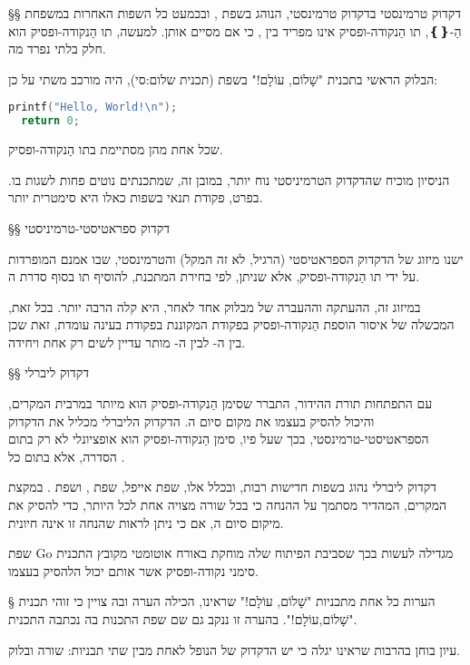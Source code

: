 §§ דקדוק טרמינסטי
בדקדוק טרמינסטי, הנוהג בשפת , ובכמעט כל השפות האחרות במשפחת הַ-{❴❵}, תו
הַנקודה-ופסיק אינו מפריד בין , כי אם מסיים אותן. למעשה, תו הַנקודה-ופסיק הוא חלק בלתי נפרד מה.

הבלוק הראשי בתכנית "שָׁלוֹם, עוֹלָם!" בשפת  ( תכנית שלום:סי), היה מורכב
משתי  על כן:

 \begin{קוד}
\begin{lstlisting}[language=C,style=code]
  printf("Hello, World!\n");
  return 0;
\end{lstlisting}
\end{קוד}
שכל אחת מהן מסתיימת בתו הַנקודה-ופסיק.

הניסיון מוכיח שהדקדוק הטרמיניסטי נוח יותר, במובן זה, שמתכנתים נוטים פחות לשגות
בו. בפרט, פקודת תנאי בשפות כאלו היא סימטרית יותר.

§§ דקדוק ספראטיסטי-טרמיניסטי

ישנו מיזוג של הדקדוק הספראטיסטי (הרגיל, לא זה המקל) והטרמינסטי, שבו אמנם
ה מופרדות על ידי תו הַנקודה-ופסיק, אלא שניתן, לפי בחירת המתכנת, להוסיף
תו  בסוף סדרת ה.

במיזוג זה, ההעתקה וההעברה של  מבלוק אחד לאחר, היא קלה הרבה יותר. בכל
זאת, המכשלה של איסור הוספת הַנקודה-ופסיק בפקודת המקוננת בפקודת  בעינה
עומדת, זאת שכן בין ה- לבין ה- מותר עדיין לשים רק  אחת
ויחידה.

§§ דקדוק ליברלי

עם התפתחות תורת ההידור, התברר שסימן הַנקודה-ופסיק הוא מיותר במרבית המקרים,
וה יכול להסיק בעצמו את מקום סיום ה. הדקדוק הליברלי מכליל את הדקדוק
הספראטיסטי-טרמינסטי, בכך שעל פיו, סימן הַנקודה-ופסיק הוא אופציונלי לא רק בתום
הסדרה, אלא בתום כל .

דקדוק ליברלי נהוג בשפות חדישות רבות, ובכלל אלו, שפת אייפל, שפת , ושפת
. במקצת המקרים, המהדיר מסתמך על ההנחה כי בכל שורה מצויה  אחת לכל
היותר, כדי להסיק את מיקום סיום ה, אם כי ניתן לראות שהנחה זו אינה חיונית.

שפת Go מגדילה לעשות בכך שסביבת הפיתוח שלה מוחקת באורח אוטומטי מקובץ התכנית
סימני נקודה-ופסיק אשר אותם יכול ה להסיק בעצמו.

§ הערות
כל אחת מתכניות "שָׁלוֹם, עוֹלָם!" שראינו, הכילה הערה ובה צויין כי זוהי תכנית
"שָׁלוֹם,עוֹלָם!". בהערה זו ננקב גם שם שפת התכנות בה נכתבה התכנית.

עיון בוחן ב הרבות שראינו יגלה כי יש הדקדוק של ה נופל לאחת מבין שתי
תבניות:  שורה ו בלוק.

